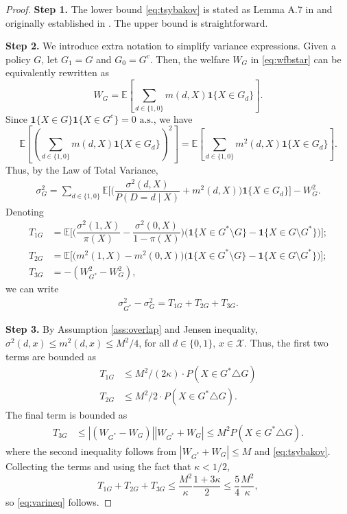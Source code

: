 \documentclass[12pt]{article}
\numberwithin{equation}{section}
\theoremstyle{plain}                         %
\theoremstyle{definition}                  %
\theoremstyle{remark}                      %
\newcommand{\E}{\mathbb{E}}
\begin{document}
%

\begin{proof}
\textbf{Step 1.} The lower bound \eqref{eq:tsybakov} is stated as Lemma A.7 in \citet{KitagawaTetenovSupp} and originally established in \citet{Tsybakov}. The upper bound is straightforward.


\textbf{Step 2.}  We introduce extra notation to simplify variance expressions. Given a policy $G$, let $G_1 = G$ and $G_0 = G^c$.  Then, the welfare $W_G$ in \eqref{eq:wfbstar} can be equivalently rewritten as  
 $$
 \textstyle  W_G = \E \left[\sum_{d \in \{1,0\}} m(d, X) \bm{1}\{ X \in G_d \}\right].
 $$
 Since $\bm{1}\{ X \in G  \} \bm{1} \{ X \in G^c \} =0 \text{ a.s.}$, we have
 $$
  \textstyle \E \left[ ( \sum_{d \in \{1,0\}} m(d, X) \bm{1}\{ X \in G_d \} )^2\right]  = \E \left[\sum_{d \in \{1,0\}} m^2(d, X) \bm{1}\{ X \in G_d \}\right].
 $$ 
Thus, by the Law of Total Variance,
\begin{align}
\textstyle \sigma^2_G = \sum_{d \in \{1,0\}} \E \bigg[ \bigg( \dfrac{ \sigma^2(d,X)}{ P (D=d \mid X) } + m^2(d,X) \bigg) \bm{1}\{ X \in G_d \} \bigg]- W^2_G. \label{eq:efficiencyboundg}
\end{align}
Denoting
\begin{align*} 
T_{1G}&= \E \bigg[ \bigg(\dfrac{\sigma^2(1,X)}{\pi(X)} -\dfrac{\sigma^2(0,X)}{1-\pi(X)} \bigg)   \bigg(\bm{1}\{ X \in G^{*} \setminus  G \} - \bm{1}\{ X \in  G \setminus G^{*}   \} \bigg) \bigg];  \\[3mm]
T_{2G}&= \E  \bigg[ \bigg(m^2(1,X) - m^2(0,X) \bigg) \bigg(\bm{1}\{ X \in G^{*} \setminus  G \} - \bm{1}\{ X \in  G \setminus G^{*}   \} \bigg) \bigg];\\[3mm]
T_{3G}&= - (W^2_{G^{*}}  - W^2_G),
\end{align*}
we can write
\begin{align}
\label{eq:sigmadiff}
\sigma^2_{G^{*}} - \sigma^2_G = T_{1G} + T_{2G} + T_{3G}.
\end{align}



\textbf{Step 3.}  By Assumption \ref{ass:overlap} and Jensen inequality, $\sigma^2(d, x) \leq m^2 (d,x) \leq M^2/4$, for all $d \in \{0, 1\}$, $x \in \mathcal{X}$. Thus, the first two terms are bounded as
\begin{align*}
T_{1G} &\leq  M^2/(2\kappa) \cdot P (X \in G^{*}  \triangle  G)\\
 T_{2G}&\leq M^2 / 2 \cdot P(X \in G^{*}  \triangle  G).
\end{align*}
The final term is bounded as
\begin{align*}
T_{3G} &\leq  |(W_{G^{*}}  - W_G)| |W_{G^{*}} + W_G|  \leq  M^2P (X \in G^{*}  \triangle  G).
\end{align*}
where the second inequality follows from $|W_{G^{*}} + W_G| \leq M$  and  \eqref{eq:tsybakov}. Collecting the terms and using the fact that $\kappa < 1/2$,
\[
T_{1G} + T_{2G} + T_{3G} \leq \frac{M^2}{\kappa} \frac{1 + 3\kappa}{2} \leq \frac{5}{4} \frac{M^2}{\kappa}, 
\]
so \eqref{eq:varineq} follows. \medskip 


\end{proof}
\end{document}
